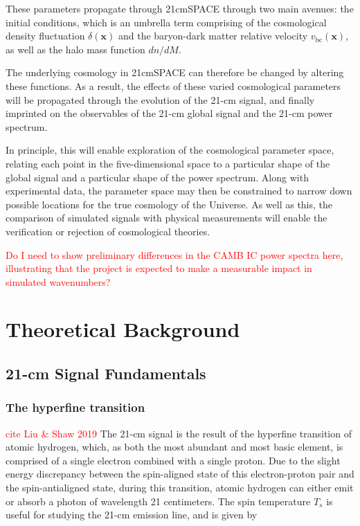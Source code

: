 \documentclass[floats,floatfix,showpacs,amssymb,prd,superscriptaddress,nofootinbib]{revtex4-2} %
\newcommand{\red}{\textcolor{red}}
\begin{document}
These parameters propagate through 21cmSPACE through two main avenues: the initial conditions, which is an umbrella term comprising of the cosmological density fluctuation $\delta(\textbf{x})$ and the baryon-dark matter relative velocity $v_{\text{bc}}(\textbf{x})$, as well as the halo mass function $dn/dM$.

The underlying cosmology in 21cmSPACE can therefore be changed by altering these functions. As a result, the effects of these varied cosmological parameters will be propagated through the evolution of the 21-cm signal, and finally imprinted on the observables of the 21-cm global signal and the 21-cm power spectrum.

In principle, this will enable exploration of the cosmological parameter space, relating each point in the five-dimensional space to a particular shape of the global signal and a particular shape of the power spectrum. Along with experimental data, the parameter space may then be constrained to narrow down possible locations for the true cosmology of the Universe. As well as this, the comparison of simulated signals with physical measurements will enable the verification or rejection of cosmological theories.

\red{Do I need to show preliminary differences in the CAMB IC power spectra here, illustrating that the project is expected to make a measurable impact in simulated wavenumbers?}


\newpage
\section{Theoretical Background}
\subsection{21-cm Signal Fundamentals}
\subsubsection{The hyperfine transition}
\red{cite Liu \& Shaw 2019} The 21-cm signal is the result of the hyperfine transition of atomic hydrogen, which, as both the most abundant and most basic element, is comprised of a single electron combined with a single proton. Due to the slight energy discrepancy between the spin-aligned state of this electron-proton pair and the spin-antialigned state, during this transition, atomic hydrogen can either emit or absorb a photon of wavelength 21 centimeters. The spin temperature $T_s$ is useful for studying the 21-cm emission line, and is given by 
\end{document}
